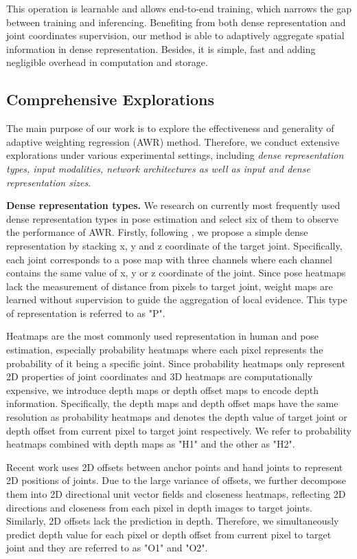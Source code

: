 \documentclass[letterpaper]{article} \usepackage{aaai20}  \usepackage{times}  \usepackage{helvet} \usepackage{courier}  \usepackage[hyphens]{url}  \usepackage{graphicx} \usepackage{amsmath}
\begin{document}
This operation is learnable and allows end-to-end training, which narrows the gap between training and inferencing. Benefiting from both dense representation and joint coordinates supervision, our method is able to adaptively aggregate spatial information in dense representation. Besides, it is simple, fast and adding negligible overhead in computation and storage.

\parskip=0pt

\subsection{Comprehensive Explorations}
The main purpose of our work is to explore the effectiveness and generality of adaptive weighting regression (AWR) method. Therefore, we conduct extensive explorations under various experimental settings, including \textit{dense representation types, input modalities, network architectures as well as input and dense representation sizes}. 

\parskip=0pt

\textbf{Dense representation types.} We research on currently most frequently used dense representation types in pose estimation and select six of them to observe the performance of AWR. Firstly, following \cite{point2pose}, we propose a simple dense representation by stacking x, y and z coordinate of the target joint. Specifically, each joint corresponds to a pose map with three channels where each channel contains the same value of x, y or z coordinate of the joint. Since pose heatmaps lack the measurement of distance from pixels to target joint, weight maps are learned without supervision to guide the aggregation of local evidence. This type of representation is referred to as "P".

Heatmaps are the most commonly used representation in human and pose estimation, especially probability heatmaps where each pixel represents the probability of it being a specific joint. Since probability heatmaps only represent 2D properties of joint coordinates and 3D heatmaps are computationally expensive, we introduce depth maps or depth offset maps to encode depth information. Specifically, the depth maps and depth offset maps have the same resolution as probability heatmaps and denotes the depth value of target joint or depth offset from current pixel to target joint respectively. We refer to probability heatmaps combined with depth maps as "H1" and the other as "H2". 

Recent work \cite{a2j} uses 2D offsets between anchor points and hand joints to represent 2D positions of joints. Due to the large variance of offsets, we further decompose them into 2D directional unit vector fields and closeness heatmaps, reflecting 2D directions and closeness from each pixel in depth images to target joints. Similarly, 2D offsets lack the prediction in depth. Therefore, we simultaneously predict depth value for each pixel or depth offset from current pixel to target joint and they are referred to as "O1" and "O2". 
\end{document}
